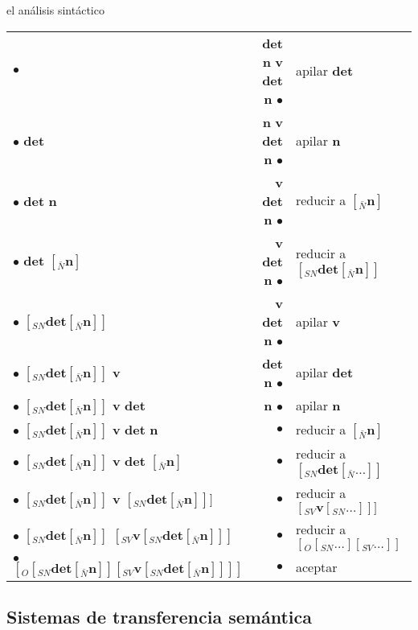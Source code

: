 \begin{persabermes}{el análisis sintáctico}
\begin{center}
\begin{tabular}{l|r|l}
$\bullet$ &\textbf{det} \textbf{n} \textbf{v} \textbf{det} \textbf{n} $\bullet$ &apilar \textbf{det} \\ $\bullet$ \textbf{det} &\textbf{n} \textbf{v} \textbf{det} \textbf{n} $\bullet$ &apilar \textbf{n} \\ $\bullet$ \textbf{det} \textbf{n} &\textbf{v} \textbf{det} \textbf{n} $\bullet$ &reducir a $[_{\bar{N}} \mathbf{n} ]$ \\ $\bullet$ \textbf{det} $[_{\bar{N}} \textbf{n} ]$ &\textbf{v} \textbf{det} \textbf{n} $\bullet$ &reducir a $[_{SN} \textbf{det} [_{\bar{N}} \mathbf{n} ] ]$ \\ $\bullet$ $[_{SN} \textbf{det} [_{\bar{N}} \textbf{n} ] ]$ &\textbf{v} \textbf{det} \textbf{n} $\bullet$ &apilar \textbf{v} \\ $\bullet$ $[_{SN} \textbf{det} [_{\bar{N}} \textbf{n} ] ]$ \textbf{v} &\textbf{det} \textbf{n} $\bullet$ &apilar \textbf{det} \\ $\bullet$ $[_{SN} \textbf{det} [_{\bar{N}} \textbf{n} ] ]$ \textbf{v} \textbf{det} &\textbf{n} $\bullet$ &apilar \textbf{n} \\ $\bullet$ $[_{SN} \textbf{det} [_{\bar{N}} \textbf{n} ] ]$ \textbf{v} \textbf{det} \textbf{n} &$\bullet$ &reducir a $[_{\bar{N}} \mathbf{n} ]$ \\ $\bullet$ $[_{SN} \textbf{det} [_{\bar{N}} \textbf{n} ] ]$ \textbf{v} \textbf{det} $[_{\bar{N}} \textbf{n} ]$ &$\bullet$ &reducir a $[_{SN} \textbf{det} [_{\bar{N}} \ldots ] ]$ \\ $\bullet$ $[_{SN} \textbf{det} [_{\bar{N}} \textbf{n} ] ]$ \textbf{v} $[_{SN} \textbf{det} [_{\bar{N}} \textbf{n} ] ] ]$ &$\bullet$ &reducir a $[_{SV} \textbf{v} [_{SN} \ldots ] ] ]$ \\ $\bullet$ $[_{SN} \textbf{det} [_{\bar{N}} \textbf{n} ] ]$ $[_{SV} \textbf{v} [_{SN} \textbf{det} [_{\bar{N}} \textbf{n} ] ] ]$ &$\bullet$ &reducir a $[_O [_{SN} \ldots ] [_{SV} \ldots ] ]$ \\ $\bullet$ $[_O [_{SN} \textbf{det} [_{\bar{N}} \textbf{n} ] ] [_{SV} \textbf{v} [_{SN} \textbf{det} [_{\bar{N}} \textbf{n} ] ] ] ]$ &$\bullet$ &aceptar \\ \hline

\end{tabular} \end{center} \end{persabermes} 

\subsection{Sistemas de transferencia semántica} \label{s3:transsem} 

